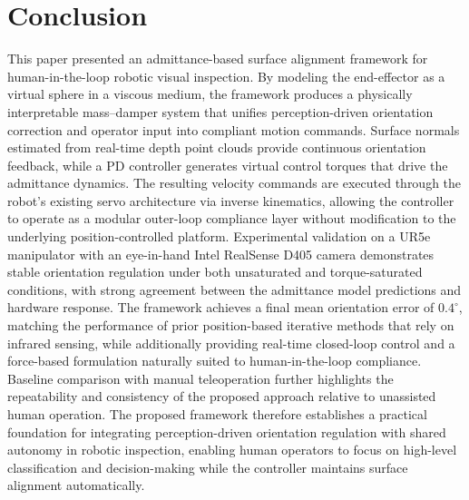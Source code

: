 \documentclass[journal]{IEEEtran}
\begin{document}





\section{Conclusion}

This paper presented an admittance-based surface alignment framework for human-in-the-loop robotic visual inspection. By modeling the end-effector as a virtual sphere in a viscous medium, the framework produces a physically interpretable mass–damper system that unifies perception-driven orientation correction and operator input into compliant motion commands. Surface normals estimated from real-time depth point clouds provide continuous orientation feedback, while a PD controller generates virtual control torques that drive the admittance dynamics. The resulting velocity commands are executed through the robot's existing servo architecture via inverse kinematics, allowing the controller to operate as a modular outer-loop compliance layer without modification to the underlying position-controlled platform.
Experimental validation on a UR5e manipulator with an eye-in-hand Intel RealSense D405 camera demonstrates stable orientation regulation under both unsaturated and torque-saturated conditions, with strong agreement between the admittance model predictions and hardware response. The framework achieves a final mean orientation error of $0.4^\circ$, matching the performance of prior position-based iterative methods that rely on infrared sensing, while additionally providing real-time closed-loop control and a force-based formulation naturally suited to human-in-the-loop compliance. Baseline comparison with manual teleoperation further highlights the repeatability and consistency of the proposed approach relative to unassisted human operation.
The proposed framework therefore establishes a practical foundation for integrating perception-driven orientation regulation with shared autonomy in robotic inspection, enabling human operators to focus on high-level classification and decision-making while the controller maintains surface alignment automatically.
\end{document}
